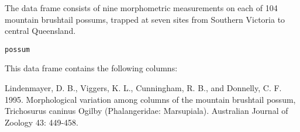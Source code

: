 \begin{Description}\relax
The  data frame consists of nine morphometric
measurements on each of 104 mountain brushtail possums, trapped
at seven sites from Southern Victoria to central Queensland.
\end{Description}
\begin{Usage}
\begin{verbatim}possum\end{verbatim}
\end{Usage}
\begin{Format}\relax
This data frame contains the following columns:
\end{Format}
\begin{Source}\relax
Lindenmayer, D. B., Viggers, K. L., Cunningham, R. B., and
Donnelly, C. F. 1995. Morphological variation among columns of the
mountain brushtail possum, Trichosurus caninus Ogilby
(Phalangeridae: Marsupiala). Australian Journal of Zoology 43:
449-458.
\end{Source}
